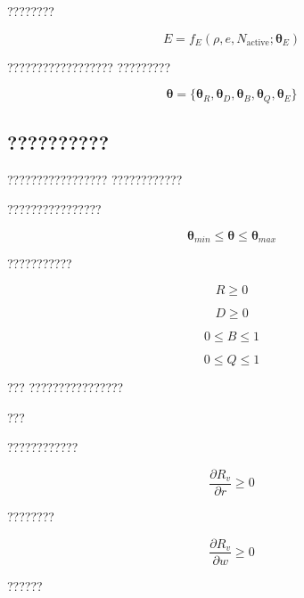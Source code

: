 ????????

\begin{equation}
E
=
f_E
(
\rho,e,N_{\mathrm{active}};
\boldsymbol{\theta}_E
)
\end{equation}


??????????????????
?????????

\begin{equation}
\boldsymbol{\theta}
=
\{
\boldsymbol{\theta}_R,
\boldsymbol{\theta}_D,
\boldsymbol{\theta}_B,
\boldsymbol{\theta}_Q,
\boldsymbol{\theta}_E
\}
\end{equation}



\subsection*{??????????}

?????????????????
????????????

????????????????

\begin{equation}
\boldsymbol{\theta}_{min}
\leq
\boldsymbol{\theta}
\leq
\boldsymbol{\theta}_{max}
\end{equation}


???????????

\begin{equation}
R\geq0
\end{equation}

\begin{equation}
D\geq0
\end{equation}

\begin{equation}
0\leq B\leq1
\end{equation}

\begin{equation}
0\leq Q\leq1
\end{equation}


???
????????????????


???

????????????

\begin{equation}
\frac{\partial R_v}{\partial r}
\geq0
\end{equation}


????????

\begin{equation}
\frac{\partial R_v}{\partial w}
\geq0
\end{equation}


??????

